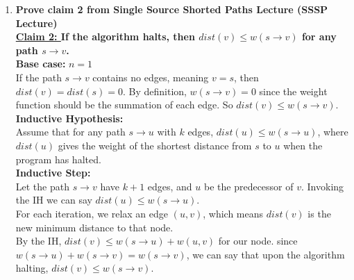 \documentclass{article}
\begin{document}
\begin{enumerate}
\item \textbf{ Prove claim 2 from Single Source Shorted Paths Lecture (SSSP Lecture) } \\
\newline 
\textbf{ \underline{ Claim 2: } If the algorithm halts, then $dist(v) \leq w(s \rightarrow v)$ for any path $s \rightarrow v$. } \\

\textbf{Base case: } $n=1$ \\
If the path $s \rightarrow v$ contains no edges, meaning $v = s$, then $dist(v) = dist(s) = 0$. By definition, $w(s \rightarrow v) = 0$ since the weight function should be the summation of each edge. So $dist(v) \leq w(s \rightarrow v)$. \\
\newline 
\textbf{Inductive Hypothesis:} \\
Assume that for any path $s \rightarrow u$ with $k$ edges, $dist(u) \leq w(s \rightarrow u)$, where $dist(u)$ gives the weight of the shortest distance from $s$ to $u$ when the program has halted. \\
\newline 
\textbf{Inductive Step:} \\
Let the path $s \rightarrow v$ have $k+1$ edges, and $u$ be the predecessor of $v$. Invoking the IH we can say $dist(u) \leq w(s \rightarrow u)$. \\
\newline 
For each iteration, we relax an edge $(u,v)$, which means $dist(v)$ is the new minimum distance to that node. \\
\newline 
By the IH, $dist(v) \leq w(s \rightarrow u) + w(u,v)$ for our node. since $w(s \rightarrow u) + w(s \rightarrow v) = w(s \rightarrow v)$, we can say that upon the algorithm halting, $dist(v) \leq w(s \rightarrow v)$. 













%



\end{enumerate}
\end{document}
